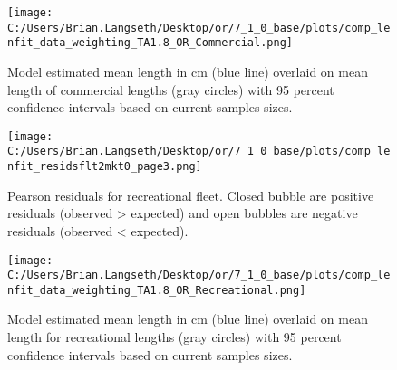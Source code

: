 \documentclass[11pt,
  english,
  a4paper,
]{article}
\begin{document}
\tagmcend\tagstructend


\begin{figure}
\centering
\texttt{[image: C:/Users/Brian.Langseth/Desktop/or/7\_1\_0\_base/plots/comp\_lenfit\_data\_weighting\_TA1.8\_OR\_Commercial.png]}
\caption{Model estimated mean length in cm (blue line) overlaid on mean length of commercial lengths (gray circles) with 95 percent confidence intervals based on current samples sizes.\label{fig:com-mean-len-fit}}
\end{figure}

\tagmcend\tagstructend


\begin{figure}
\centering
\texttt{[image: C:/Users/Brian.Langseth/Desktop/or/7\_1\_0\_base/plots/comp\_lenfit\_residsflt2mkt0\_page3.png]}
\caption{Pearson residuals for recreational fleet. Closed bubble are positive residuals (observed \textgreater{} expected) and open bubbles are negative residuals (observed \textless{} expected).\label{fig:rec-pearson}}
\end{figure}

\tagmcend\tagstructend


\begin{figure}
\centering
\texttt{[image: C:/Users/Brian.Langseth/Desktop/or/7\_1\_0\_base/plots/comp\_lenfit\_data\_weighting\_TA1.8\_OR\_Recreational.png]}
\caption{Model estimated mean length in cm (blue line) overlaid on mean length for recreational lengths (gray circles) with 95 percent confidence intervals based on current samples sizes.\label{fig:rec-mean-len-fit}}
\end{figure}
\end{document}
